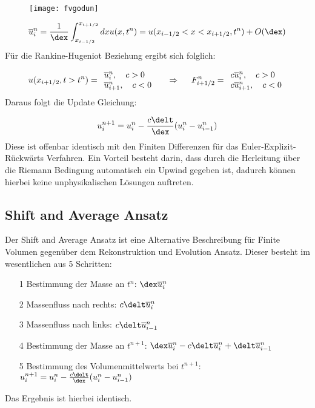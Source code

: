 \begin{figure}[ht]
	\centering
	\texttt{[image: fvgodun]}
\end{figure}
\begin{equation*}
	\overline{u}^{n}_i = \frac{1}{\dex}\int_{x_{i-1/2}}^{x_{i+1/2}}dxu(x,t^n) = u(x_{i-1/2} < x < x_{i+1/2},t^n) + O(\dex)
\end{equation*}
F\"ur die Rankine-Hugeniot Beziehung ergibt sich folglich:
\par
\begin{equation*}
u(x_{i+1/2},t>t^n) = \begin{array}{l l } \overline{u}^n_i,~~~c>0 \\ \overline{u}^n_{i+1},~~~c<0 \end{array}~~~~\Rightarrow~~~~F^n_{i+1/2} = \begin{array}{l l } c\overline{u}_i^n,~~~c>0 \\ c\overline{u}^n_{i+1},~~~c<0 \end{array}
\end{equation*}
Daraus folgt die Update Gleichung:
\par
\begin{equation*}
	u^{n+1}_i = u^n_i - \frac{c\delt}{\dex}(u^n_{i} - u^n_{i-1})
\end{equation*}
Diese ist offenbar identisch mit den Finiten Differenzen f\"ur das Euler-Explizit-R\"uckw\"arts Verfahren. Ein Vorteil besteht darin, dass durch die Herleitung \"uber die Riemann Bedingung automatisch ein Upwind gegeben ist, dadurch k\"onnen hierbei keine unphysikalischen L\"osungen auftreten.

\subsection{Shift and Average Ansatz}
Der Shift and Average Ansatz ist eine Alternative Beschreibung f\"ur Finite Volumen gegen\"uber dem Rekonstruktion und Evolution Ansatz. Dieser besteht im wesentlichen aus 5 Schritten:
\begin{itemize}
	\item[1] Bestimmung der Masse an $t^n$: $\dex\overline{u}_i^n$
	\item[2] Massenfluss nach rechts: $c\delt\overline{u}_i^n$
	\item[3] Massenfluss nach links: $c\delt\overline{u}_{i-1}^n$
	\item[4] Bestimmung der Masse an $t^{n+1}$: $\dex\overline{u}_i^n-c\delt\overline{u}_i^n+\delt\overline{u}_{i-1}^n$
	\item[5] Bestimmung des Volumenmittelwerts bei $t^{n+1}$: $u^{n+1}_i = u^n_i - \frac{c\delt}{\dex}(u^n_{i} - u^n_{i-1})$
\end{itemize}
Das Ergebnis ist hierbei identisch.

